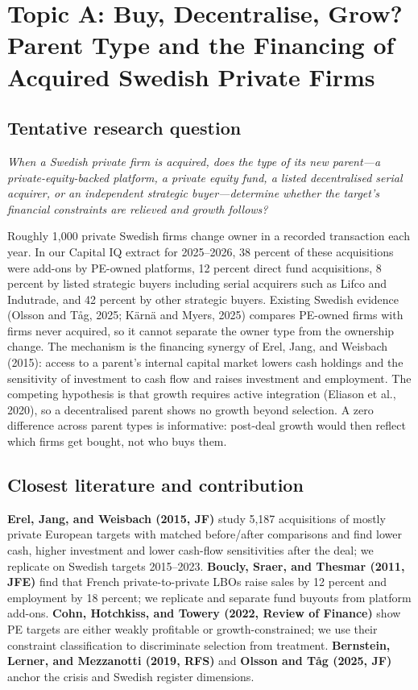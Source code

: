 \documentclass[12pt,a4paper]{article}
\begin{document}
\newpage

\section{Topic A: Buy, Decentralise, Grow? Parent Type and the Financing of Acquired Swedish Private Firms}

\subsection{Tentative research question}

\emph{When a Swedish private firm is acquired, does the type of its new parent---a private-equity-backed platform, a private equity fund, a listed decentralised serial acquirer, or an independent strategic buyer---determine whether the target's financial constraints are relieved and growth follows?}

Roughly 1,000 private Swedish firms change owner in a recorded transaction each year. In our Capital IQ extract for 2025--2026, 38 percent of these acquisitions were add-ons by PE-owned platforms, 12 percent direct fund acquisitions, 8 percent by listed strategic buyers including serial acquirers such as Lifco and Indutrade, and 42 percent by other strategic buyers. Existing Swedish evidence (Olsson and T\aa g, 2025; K\"arn\"a and Myers, 2025) compares PE-owned firms with firms never acquired, so it cannot separate the owner type from the ownership change. The mechanism is the financing synergy of Erel, Jang, and Weisbach (2015): access to a parent's internal capital market lowers cash holdings and the sensitivity of investment to cash flow and raises investment and employment. The competing hypothesis is that growth requires active integration (Eliason et al., 2020), so a decentralised parent shows no growth beyond selection. A zero difference across parent types is informative: post-deal growth would then reflect which firms get bought, not who buys them.

\subsection{Closest literature and contribution}

\textbf{Erel, Jang, and Weisbach (2015, JF)} study 5,187 acquisitions of mostly private European targets with matched before/after comparisons and find lower cash, higher investment and lower cash-flow sensitivities after the deal; we replicate on Swedish targets 2015--2023. \textbf{Boucly, Sraer, and Thesmar (2011, JFE)} find that French private-to-private LBOs raise sales by 12 percent and employment by 18 percent; we replicate and separate fund buyouts from platform add-ons. \textbf{Cohn, Hotchkiss, and Towery (2022, Review of Finance)} show PE targets are either weakly profitable or growth-constrained; we use their constraint classification to discriminate selection from treatment. \textbf{Bernstein, Lerner, and Mezzanotti (2019, RFS)} and \textbf{Olsson and T\aa g (2025, JF)} anchor the crisis and Swedish register dimensions.
\end{document}
